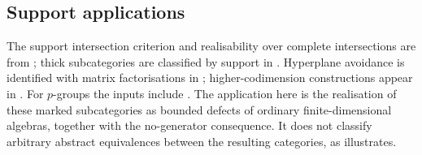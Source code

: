 \subsection{Support applications}
The support intersection criterion and realisability over complete intersections are from \cite{AvramovBuchweitz00,BerghJorgensenEasy}; thick subcategories are classified by support in \cite{Stevenson14}. Hyperplane avoidance is identified with matrix factorisations in \cite[Theorem~3.5]{BerghJorgensenMF}; higher-codimension constructions appear in \cite{BurkeWalker15}. For \(p\)-groups the inputs include \cite{Carlson83,Carlson84,AvruninScott82,Quillen71}. The application here is the realisation of these marked subcategories as bounded defects of ordinary finite-dimensional algebras, together with the no-generator consequence. It does not classify arbitrary abstract equivalences between the resulting categories, as  illustrates.
